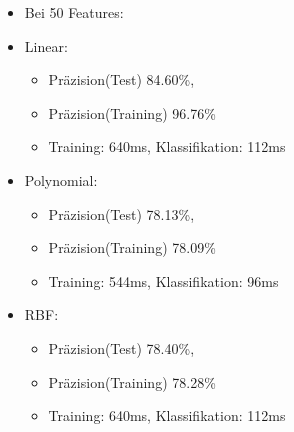 \begin{frame}
  \begin{itemize}
  \item Bei 50 Features:
  \item Linear: 
  \begin{itemize}
  \item Präzision(Test) 84.60\%,
  \item Präzision(Training)  96.76\%
  \item Training: 640ms, Klassifikation: 112ms
\end{itemize}
  \item Polynomial:
  \begin{itemize}
  \item Präzision(Test) 78.13\%,
  \item Präzision(Training)  78.09\%
  \item Training: 544ms, Klassifikation:
  96ms
\end{itemize}
  \item RBF: 
  \begin{itemize}
  \item Präzision(Test) 78.40\%,
  \item Präzision(Training)  78.28\%
  \item Training: 640ms,  Klassifikation: 112ms
\end{itemize}
\end{itemize}
\end{frame}

	
	
	